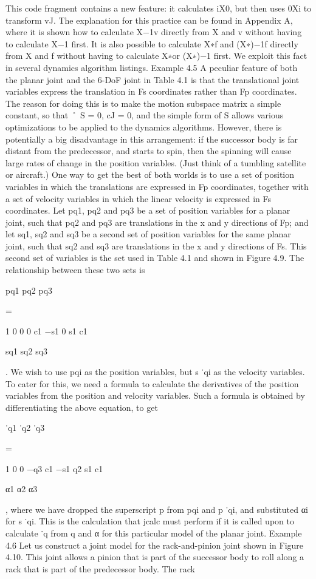This code fragment contains a new feature: it calculates iX0, but then uses 0Xi to transform vJ. The explanation for this practice can be found in Appendix A, where it is shown how to calculate X−1v directly from X and v without having to calculate X−1 first. It is also possible to calculate X∗f and (X∗)−1f directly from X and f without having to calculate X∗or (X∗)−1 first. We exploit this fact in several dynamics algorithm listings. Example 4.5 A peculiar feature of both the planar joint and the 6-DoF joint in Table 4.1 is that the translational joint variables express the translation in Fs coordinates rather than Fp coordinates. The reason for doing this is to make the motion subspace matrix a simple constant, so that ˚ S = 0, cJ = 0, and the simple form of S allows various optimizations to be applied to the dynamics algorithms. However, there is potentially a big disadvantage in this arrangement: if the successor body is far distant from the predecessor, and starts to spin, then the spinning will cause large rates of change in the position variables. (Just think of a tumbling satellite or aircraft.) One way to get the best of both worlds is to use a set of position variables in which the translations are expressed in Fp coordinates, together with a set of velocity variables in which the linear velocity is expressed in Fs coordinates. Let pq1, pq2 and pq3 be a set of position variables for a planar joint, such that pq2 and pq3 are translations in the x and y directions of Fp; and let sq1, sq2 and sq3 be a second set of position variables for the same planar joint, such that sq2 and sq3 are translations in the x and y directions of Fs. This second set of variables is the set used in Table 4.1 and shown in Figure 4.9. The relationship between these two sets is

pq1 pq2 pq3

=

1 0 0 0 c1 −s1 0 s1 c1

sq1 sq2 sq3

. We wish to use pqi as the position variables, but s ˙qi as the velocity variables. To cater for this, we need a formula to calculate the derivatives of the position variables from the position and velocity variables. Such a formula is obtained by differentiating the above equation, to get

˙q1 ˙q2 ˙q3

=

1 0 0 −q3 c1 −s1 q2 s1 c1

α1 α2 α3

, where we have dropped the superscript p from pqi and p ˙qi, and substituted αi for s ˙qi. This is the calculation that jcalc must perform if it is called upon to calculate ˙q from q and α for this particular model of the planar joint. Example 4.6 Let us construct a joint model for the rack-and-pinion joint shown in Figure 4.10. This joint allows a pinion that is part of the successor body to roll along a rack that is part of the predecessor body. The rack

